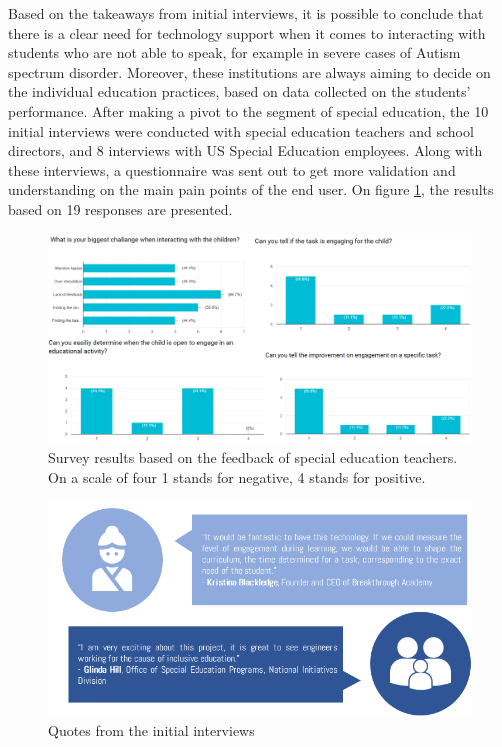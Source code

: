 \documentclass[letterpaper,10pt]{article}
\begin{document}
Based on the takeaways from initial interviews, it is possible to conclude that there is a clear need for technology support when it comes to interacting with students who are not able to speak, for example in severe cases of Autism spectrum disorder. Moreover, these institutions are always aiming to decide on the individual education practices, based on data collected on the students’ performance. After making a pivot to the segment of special education, the 10 initial interviews were conducted with special education teachers and school directors, and 8 interviews with US Special Education employees.  
Along with these interviews, a questionnaire was sent out to get more validation and understanding on the main pain points of the end user. On figure \ref{img:specedq}, the results based on 19 responses are presented.

\begin{figure}[!htb]
\centering
\includegraphics[scale=0.5]{surveyspec.png}
\caption[Survey results based on the feedback of special education teachers]{Survey results based on the feedback of special education teachers. On a scale of four 1 stands for negative, 4 stands for positive.}
\label{img:specedq}
\end{figure}

\begin{figure}[!htb]
\centering
\includegraphics[scale=0.5]{quotes.png}
\caption{Quotes from the initial interviews}
\label{img:quotes}
\end{figure}
\end{document}

